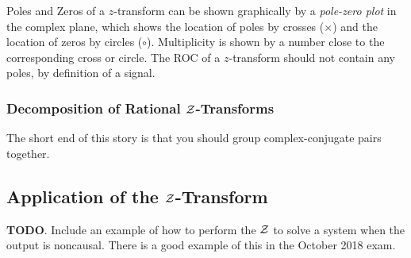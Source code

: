 \begin{definition}\label{def:Pole-Zero Plot of Z-Transform}
  Poles and Zeros of a $z$-transform can be shown graphically by a \emph{pole-zero plot} in the complex plane, which shows the location of poles by crosses ($\times$) and the location of zeros by circles ($\circ$).
  Multiplicity is shown by a number close to the corresponding cross or circle.
  The ROC of a $z$-transform should not contain any poles, by definition of a  signal.
\end{definition}

\subsubsection{Decomposition of Rational \texorpdfstring{$\operatorname{\mathcal{Z}}$-Transforms}{Z-Transform}}\label{subsubsec:Decompose Rational Z-Transforms}
The short end of this story is that you should group complex-conjugate pairs together.

\subsection{Application of the \texorpdfstring{$\operatorname{\mathcal{Z}}$-Transform}{Z-Transform}}\label{subsec:Application_Z-Transform}
\textbf{TODO}.
Include an example of how to perform the $\operatorname{\mathcal{Z}}$ to solve a system when the output is noncausal.
There is a good example of this in the October 2018 exam.

